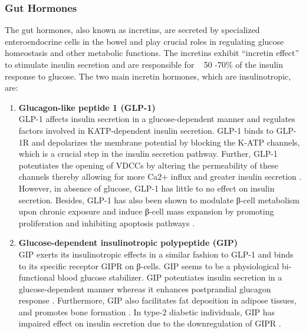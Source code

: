 \subsubsection{Gut Hormones}
The gut hormones, also known as incretins, are secreted by specialized enteroendocrine cells in the bowel and play crucial roles in regulating glucose homeostasis and other metabolic functions. The incretins exhibit “incretin effect” to stimulate insulin secretion and are responsible for ~ 50 -70\% of the insulin response to glucose. The two main incretin hormones, which are insulinotropic, are:

\begin{enumerate}
    \item\textbf{Glucagon-like peptide 1 (GLP-1)}\\
    GLP-1 affects insulin secretion in a glucose-dependent manner and regulates factors involved in KATP-dependent insulin secretion. GLP-1 binds to GLP-1R and depolarizes the membrane potential by blocking the K-ATP channels, which is a crucial step in the insulin secretion pathway. Further, GLP-1 potentiates the opening of VDCCs by altering the permeability of these channels thereby allowing for more Ca2+ influx and greater insulin secretion \textbf{\cite{meloni_glp-1_2013}}. However, in absence of glucose, GLP-1 has little to no effect on insulin secretion. Besides, GLP-1 has also been shown to modulate β-cell metabolism upon chronic exposure \textbf{\cite{carlessi_glp-1_2017}} and induce β-cell mass expansion by promoting proliferation and inhibiting apoptosis pathways \textbf{\cite{macdonald_multiple_2002}}. 
    \item\textbf{Glucose-dependent insulinotropic polypeptide (GIP)}\\GIP exerts its insulinotropic effects in a similar fashion to GLP-1 and binds to its specific receptor GIPR on β-cells. GIP seems to be a physiological bi-functional blood glucose stabilizer. GIP potentiates insulin secretion in a glucose-dependent manner whereas it enhances postprandial glucagon response \textbf{\cite{seino_gip_2010, christensen_glucose-dependent_2011}}. Furthermore, GIP also facilitates fat deposition in adipose tissues, and promotes bone formation \textbf{\cite{seino_gip_2010}}. In type-2 diabetic individuals, GIP has impaired effect on insulin secretion due to the downregulation of GIPR \textbf{\cite{irwin_therapeutic_2009}}.

\end{enumerate}

